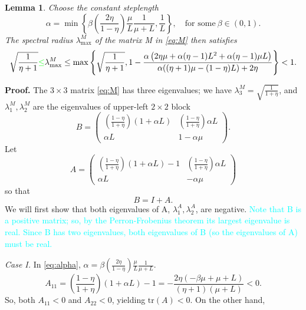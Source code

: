 \documentclass[11pt]{article}
\newtheorem{lem}[thm]{Lemma}
\begin{document}
\begin{lem} \label{lemma:spectral} 
 Choose the constant steplength
 \begin{equation}\label{eq:alpha}
    \alpha = \min\left\lbrace\beta\left(\frac{2 \eta}{1-\eta} \right)\frac{\mu}{L}\frac{1}{\mu+L},\frac{1}{L}\right\rbrace, \quad \mbox{for some} \ \beta  \in(0,1).
 \end{equation}
 The spectral radius $\lambda^M_{\max}$ of the matrix M in \eqref{eq:M} then satisfies
 \begin{equation}\label{eq:spectral}
  \sqrt{\frac{1}{\eta +1}}\textcolor{green}{\leq}\lambda^M_{\max} \leq \max\left\lbrace \sqrt{\frac{1}{\eta +1}}, 1-\frac{\alpha  \left(2 \eta  \mu +\alpha  (\eta -1) L^2+\alpha  (\eta -1) \mu  L\right)}{\alpha  ((\eta +1) \mu -  (1-\eta ) L)+2 \eta }\right\rbrace<1 . 
 \end{equation}
\end{lem}


\textbf{Proof.}  The $3\times 3$ matrix \eqref{eq:M} has three eigenvalues; we have $\lambda^M_3=\sqrt{\frac{1}{1+\eta}}$, and $\lambda^M_1,\lambda^M_2$ are the eigenvalues of upper-left $2\times 2$ block
\begin{equation}
 B = \begin{pmatrix} {\left(\frac{1-\eta}{1+\eta}\right)}(1+\alpha  L)  &    {\left(\frac{1-\eta}{1+\eta}\right)}\alpha L \\  
                   \alpha L  & 1-\alpha \mu \end{pmatrix}.                    
\end{equation} 
Let 
\[
A = \begin{pmatrix} {\left(\frac{1-\eta}{1+\eta}\right)}(1+\alpha  L)-1 & {\left(\frac{1-\eta}{1+\eta}\right)}\alpha L\\  
                   \alpha L  & -\alpha\mu \end{pmatrix}  
\]
so that
\[
 B = I + A.
\]
We will first show that both eigenvalues of A, $\lambda^A_1,\lambda^A_2$, are negative. 
\textcolor{cyan}{Note that B is a positive matrix; so, by the Perron-Frobenius theorem its largest eigenvalue is real.  Since B has two eigenvalues, both eigenvalues of B (so the eigenvalues of A) must be real.}

\noindent
\textit{Case I.} In \eqref{eq:alpha}, $\alpha = \beta\left(\frac{2 \eta}{1-\eta} \right)\frac{\mu}{L}\frac{1}{\mu+L}$. 
\[
A_{11} = {\left(\frac{1-\eta}{1+\eta}\right)}(1+\alpha  L)-1 =-\frac{2 \eta  (-\beta  \mu +\mu +L)}{(\eta +1) (\mu +L)}< 0.
\]
So, both $A_{11}<0$ and $A_{22}<0$, yielding $\mbox{tr}(A)<0$.  On the other hand, 
\end{document}
